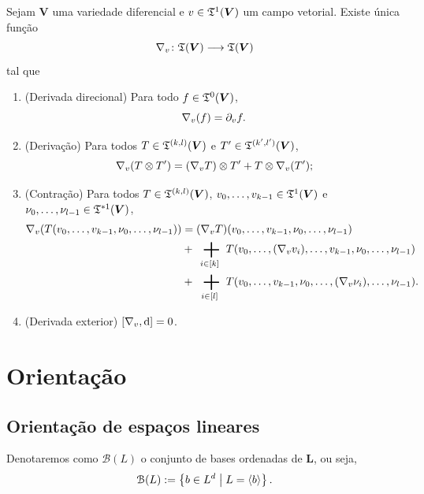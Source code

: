 \begin{proposition}
Sejam $\bm V$ uma variedade diferencial e $v \in \mathfrak{T}^1(\bm V)$ um campo vetorial. Existe única função
	\begin{equation*}
	{\nabla_v}\colon {\mathfrak{T}(\bm V)} \longrightarrow {\mathfrak{T}(\bm V)}
	\end{equation*}
tal que
	\begin{enumerate}
	\item (Derivada direcional) Para todo $f \in \mathfrak{T}^0(\bm V)$,
		\begin{equation*}
		\nabla_v(f) = \partial_v f.
		\end{equation*}
	\item (Derivação) Para todos $T \in \mathfrak{T}^{(k,l)}(\bm V)$ e $T' \in \mathfrak{T}^{(k',l')}(\bm V)$,
		\begin{equation*}
		\nabla_v(T \otimes T') = (\nabla_v T) \otimes T' + T \otimes \nabla_v (T');
		\end{equation*}
	\item (Contração) Para todos $T \in \mathfrak{T}^{(k,l)}(\bm V)$, $v_0,\ldots,v_{k-1} \in \mathfrak{T}^1(\bm V)$ e $\nu_0,\ldots,\nu_{l-1} \in \mathfrak{T}^{*1}(\bm V)$,
		\begin{align*}
		\Dir_v (T(v_0,\ldots,v_{k-1},\nu_0,\ldots,\nu_{l-1})) &= (\Dir_v T)(v_0,\ldots,v_{k-1},\nu_0,\ldots,\nu_{l-1}) \\
			&+ \sum_{i \in [k]} T(v_0,\ldots,(\Dir_v v_i),\ldots,v_{k-1},\nu_0,\ldots,\nu_{l-1}) \\
			&+ \sum_{i \in [l]} T(v_0,\ldots,v_{k-1},\nu_0,\ldots,(\Dir_v \nu_i),\ldots,\nu_{l-1}).
		\end{align*}
	\item (Derivada exterior) $\left[{\nabla_v},{\mathrm{d}}\right]=0$.
	\end{enumerate}
\end{proposition}





\section{Orientação}

\subsection{Orientação de espaços lineares}

Denotaremos como $\mathcal{B}(L)$ o conjunto de bases ordenadas de $\bm L$, ou seja,
	\begin{equation*}
	\mathcal{B}(L) := \left\{{b \in L^d}\;\middle\vert\;{L = \left\langle b \right\rangle}\right\}.
	\end{equation*}

